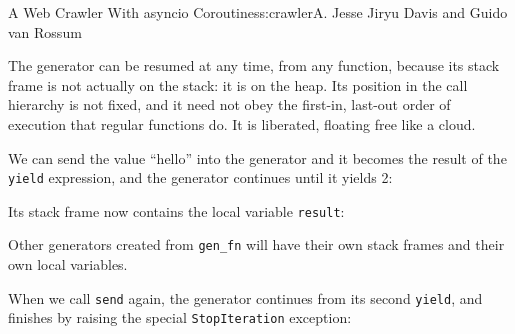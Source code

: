\begin{aosachapter}{A Web Crawler With asyncio Coroutines}{s:crawler}{A. Jesse Jiryu Davis and Guido van Rossum}
\begin{Shaded}
\begin{Highlighting}[]
\NormalTok{>>> }
\end{Highlighting}
\end{Shaded}

The generator can be resumed at any time, from any function, because its
stack frame is not actually on the stack: it is on the heap. Its
position in the call hierarchy is not fixed, and it need not obey the
first-in, last-out order of execution that regular functions do. It is
liberated, floating free like a cloud.

We can send the value ``hello'' into the generator and it becomes the
result of the \texttt{yield} expression, and the generator continues
until it yields 2:

\begin{Shaded}
\begin{Highlighting}[]
\NormalTok{)}
\end{Highlighting}
\end{Shaded}

Its stack frame now contains the local variable \texttt{result}:

\begin{Shaded}
\begin{Highlighting}[]
\NormalTok{\{}\NormalTok{: }\NormalTok{\}}
\end{Highlighting}
\end{Shaded}

Other generators created from \texttt{gen\_fn} will have their own stack
frames and their own local variables.

When we call \texttt{send} again, the generator continues from its
second \texttt{yield}, and finishes by raising the special
\texttt{StopIteration} exception:

\begin{Shaded}
\begin{Highlighting}[]
\NormalTok{)}
\end{Highlighting}
\end{Shaded}


\end{aosachapter}
